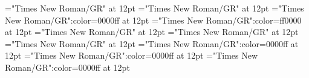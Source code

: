 \documentclass[a4paper]{article}
\begin{document}
\pagestyle{plain}
\sloppy
\setlength{\parfillskip}{0pt plus 1fil}
\font\sectionletter="Times New Roman/GR" at 12pt
\font\articlesectionletter="Times New Roman/GR" at 12pt
\font\sensearticlesectionletter="Times New Roman/GR":color=0000ff at 12pt
\font\sensebeforearticlesectionletter="Times New Roman/GR":color=ff0000 at 12pt
\font\firstoftypeheadwordlastoftypesectionletter="Times New Roman/GR" at 12pt
\font\firstoftypelastoftypepronunciationarticlesectionletter="Times New Roman/GR" at 12pt
\font\firstoftypelastoftypestressfirstoftypelastoftypepronunciationarticlesectionletter="Times New Roman/GR" at 12pt
\font\firstoftypegrammarcategorylastoftypesensearticlesectionletter="Times New Roman/GR":color=0000ff at 12pt
\font\exampleusefirstoftypelastoftypesensearticlesectionletter="Times New Roman/GR":color=0000ff at 12pt
\font\examplesensearticlesectionletter="Times New Roman/GR":color=0000ff at 12pt

\mbox{} 
\newpage 
\newpage 
\setcounter{page}{1} 
\pagestyle{fancy} 

\end{document}
